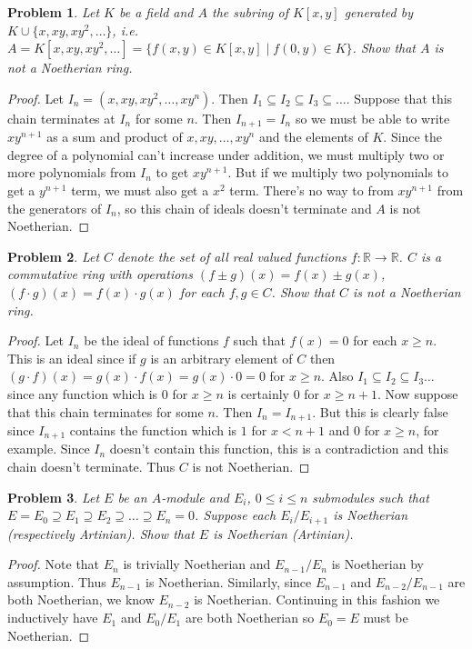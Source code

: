 \documentclass{article}
\newtheorem{problem}{Problem}
\begin{document}
\begin{problem}
Let $K$ be a field and $A$ the subring of $K[x,y]$ generated by $K \cup \{x, xy, xy^2, \dots \}$, i.e. $A = K[x, xy, xy^2, \dots ] = \{f(x,y) \in K[x,y] \mid f(0,y) \in K\}$. Show that $A$ is \emph{not} a Noetherian ring.
\end{problem}
\begin{proof}
Let $I_n = (x, xy, xy^2, \dots , xy^n)$. Then $I_1 \subseteq I_2 \subseteq I_3 \subseteq \dots$. Suppose that this chain terminates at $I_n$ for some $n$. Then $I_{n+1} = I_n$ so we must be able to write $xy^{n+1}$ as a sum and product of $x, xy, \dots , xy^n$ and the elements of $K$. Since the degree of a polynomial can't increase under addition, we must multiply two or more polynomials from $I_n$ to get $xy^{n+1}$. But if we multiply two polynomials to get a $y^{n+1}$ term, we must also get a $x^2$ term. There's no way to from $xy^{n+1}$ from the generators of $I_n$, so this chain of ideals doesn't terminate and $A$ is not Noetherian.
\end{proof}

\begin{problem}
Let $C$ denote the set of all real valued functions $f : \mathbb{R} \to \mathbb{R}$. $C$ is a commutative ring with operations $(f \pm g)(x) = f(x) \pm g(x)$, $(f \cdot g)(x) = f(x) \cdot g(x)$ for each $f, g \in C$. Show that $C$ is not a Noetherian ring.
\end{problem}
\begin{proof}
Let $I_n$ be the ideal of functions $f$ such that $f(x) = 0$ for each $x \geq n$. This is an ideal since if $g$ is an arbitrary element of $C$ then $(g \cdot f)(x) = g(x) \cdot f(x) = g(x) \cdot 0 = 0$ for $x \geq n$. Also $I_1 \subseteq I_2 \subseteq I_3 \dots$ since any function which is $0$ for $x \geq n$ is certainly $0$ for $x \geq n+1$. Now suppose that this chain terminates for some $n$. Then $I_n = I_{n+1}$. But this is clearly false since $I_{n+1}$ contains the function which is $1$ for $x < n+1$ and $0$ for $x \geq n$, for example. Since $I_n$ doesn't contain this function, this is a contradiction and this chain doesn't terminate. Thus $C$ is not Noetherian.
\end{proof}

\begin{problem}
Let $E$ be an $A$-module and $E_i$, $0 \leq i \leq n$ submodules such that $E = E_0 \supseteq E_1 \supseteq E_2 \supseteq \dots \supseteq E_n = 0$. Suppose each $E_i/E_{i+1}$ is Noetherian (respectively Artinian). Show that $E$ is Noetherian (Artinian).
\end{problem}
\begin{proof}
Note that $E_n$ is trivially Noetherian and $E_{n-1}/E_n$ is Noetherian by assumption. Thus $E_{n-1}$ is Noetherian. Similarly, since $E_{n-1}$ and $E_{n-2}/E_{n-1}$ are both Noetherian, we know $E_{n-2}$ is Noetherian. Continuing in this fashion we inductively have $E_1$ and $E_0/E_1$ are both Noetherian so $E_0 = E$ must be Noetherian.
\end{proof}
\end{document}
